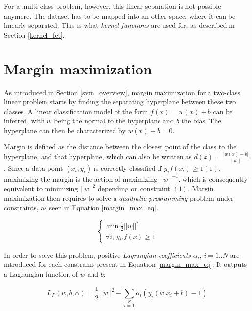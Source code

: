 \noindent For a multi-class problem, however, this linear separation is not possible anymore. The dataset has to be mapped into an other space, where it can be linearly separated. This is what \textit{kernel functions} are used for, as described in Section \ref{kernel_fct}.
\newline

\section{Margin maximization}
\label{margin_max}

\vspace{\baselineskip}
\noindent As introduced in Section \ref{svm_overview}, margin maximization for a two-class linear problem starts by finding the separating hyperplane between these two classes. A linear classification model of the form $f(x) = w(x) + b$ can be inferred, with $w$ being the normal to the hyperplane and $b$ the bias. The hyperplane can then be characterized by  $w(x) + b = 0$.
\newline

\noindent Margin is defined as the distance between the closest point of the class to the hyperplane, and that hyperplane, which can also be written as $ d(x) = \frac{|w(x) + b |}{||w||}$. Since a data point $(x_i, y_i)$ is correctly classified if $y_if(x_i) \geq 1 (1)$, maximizing the margin is the action of maximizing $||w||^{-1}$, which is consequently equivalent to minimizing $||w||^2$ depending on constraint $(1)$. Margin maximization then requires to solve a \textit{quadratic programming} problem under constraints, as seen in Equation \ref{margin_max_eq}.

\begin{equation}
\left\{
\begin{array}{l}
\min \frac{1}{2} ||w||^2 \\
\forall i, \, y_i . f(x) \geq 1
\end{array}
\right.
\label{margin_max_eq}
\end{equation}
\vspace{\baselineskip}

\noindent In order to solve this problem, positive \textit{Lagrangian coefficients} $\alpha_i$, $i=1..N$ are introduced for each constraint present in Equation \ref{margin_max_eq}. It outputs a Lagrangian function of $w$ and $b$:

\begin{equation}
L_P(w, b,\alpha) = \frac{1}{2}||w||^2 - \sum\limits_{i=1}\limits^{N}\alpha_i\left(y_i(w.x_i + b) -1\right)
\label{lagrangian}
\end{equation}
\vspace{\baselineskip}

